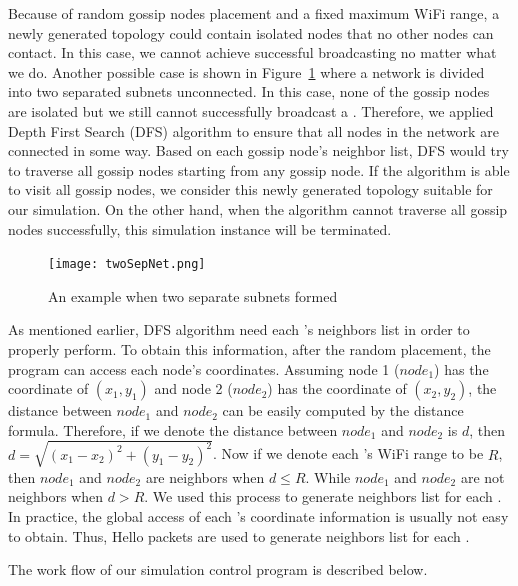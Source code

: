 Because of random gossip nodes placement and a fixed maximum WiFi range, a newly generated topology could contain isolated nodes that no other nodes can contact. In this case, we cannot achieve successful broadcasting no matter what we do. Another possible case is shown in Figure~\ref{fig:twoSepNet} where a network is divided into two separated subnets unconnected. In this case, none of the gossip nodes are isolated but we still cannot successfully broadcast a \msg. Therefore, we applied Depth First Search (DFS) algorithm to ensure that all nodes in the network are connected in some way. Based on each gossip node's neighbor list, DFS would try to traverse all gossip nodes starting from any gossip node. If the algorithm is able to visit all gossip nodes, we consider this newly generated topology suitable for our simulation. On the other hand, when the algorithm cannot traverse all gossip nodes successfully, this simulation instance will be terminated.

\begin{figure}
	\centering
	\texttt{[image: twoSepNet.png]}
	\caption{An example when two separate subnets formed}
	\label{fig:twoSepNet}
\end{figure}

As mentioned earlier, DFS algorithm need each \gn's neighbors list in order to properly perform. To obtain this information, after the random \gn placement, the program can access each node's coordinates. Assuming node 1 ($node_1$) has the coordinate of $(x_1, y_1)$ and node 2 ($node_2$) has the coordinate of $(x_2, y_2)$, the distance between $node_1$ and $node_2$ can be easily computed by the distance formula. Therefore, if we denote the distance between $node_1$ and $node_2$ is $d$, then $d = \sqrt{(x_1 - x_2)^2+(y_1 - y_2)^2}$. Now if we denote each \gn's WiFi range to be $R$, then $node_1$ and $node_2$ are neighbors when $d\leq R$. While $node_1$ and $node_2$ are not neighbors when $d > R$. We used this process to generate neighbors list for each \gn. In practice, the global access of each \gn's coordinate information is usually not easy to obtain. Thus, Hello packets are used to generate neighbors list for each \gn.

The work flow of our simulation control program is described below. 

